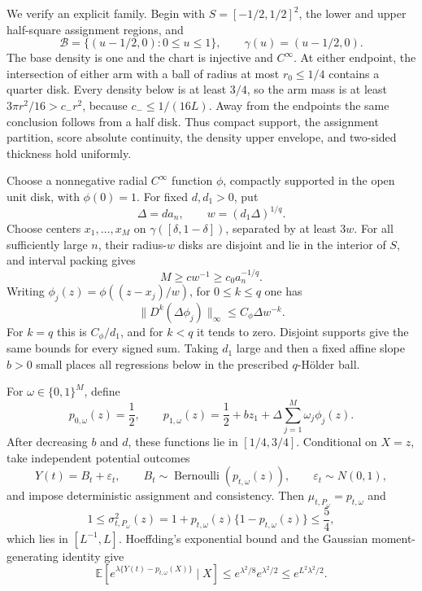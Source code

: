 We verify an explicit family.  Begin with \(S=[-1/2,1/2]^2\), the lower and upper half-square assignment regions, and
\[
 \mathcal B=\{(u-1/2,0):0\leq u\leq1\},
 \qquad \gamma(u)=(u-1/2,0).
\]
The base density is one and the chart is injective and \(C^\infty\).  At either endpoint, the intersection of either arm with a ball of radius at most \(r_0\leq1/4\) contains a quarter disk.  Every density below is at least \(3/4\), so the arm mass is at least \(3\pi r^2/16>c_-r^2\), because \(c_-\leq1/(16L)\).  Away from the endpoints the same conclusion follows from a half disk.  Thus compact support, the assignment partition, score absolute continuity, the density upper envelope, and two-sided thickness hold uniformly.

Choose a nonnegative radial \(C^\infty\) function \(\phi\), compactly supported in the open unit disk, with \(\phi(0)=1\).  For fixed \(d,d_1>0\), put
\[
 \Delta=d a_n,
 \qquad w=(d_1\Delta)^{1/q}.
\]
Choose centers \(x_1,\ldots,x_M\) on \(\gamma([\delta,1-\delta])\), separated by at least \(3w\).  For all sufficiently large \(n\), their radius-\(w\) disks are disjoint and lie in the interior of \(S\), and interval packing gives
\[
 M\geq c w^{-1}\geq c_0a_n^{-1/q}.
\]
Writing \(\phi_j(z)=\phi((z-x_j)/w)\), for \(0\leq k\leq q\) one has
\[
 \lVert D^k(\Delta\phi_j)\rVert_\infty
 \leq C_\phi\Delta w^{-k}.
\]
For \(k=q\) this is \(C_\phi/d_1\), and for \(k<q\) it tends to zero.  Disjoint supports give the same bounds for every signed sum.  Taking \(d_1\) large and then a fixed affine slope \(b>0\) small places all regressions below in the prescribed \(q\)-H\"older ball.

For \(\omega\in\{0,1\}^M\), define
\[
 p_{0,\omega}(z)=\frac12,
 \qquad
 p_{1,\omega}(z)=\frac12+bz_1+\Delta\sum_{j=1}^M\omega_j\phi_j(z).
\]
After decreasing \(b\) and \(d\), these functions lie in \([1/4,3/4]\).  Conditional on \(X=z\), take independent potential outcomes
\[
 Y(t)=B_t+\varepsilon_t,
 \qquad B_t\sim\operatorname{Bernoulli}(p_{t,\omega}(z)),
 \qquad \varepsilon_t\sim N(0,1),
\]
and impose deterministic assignment and consistency.  Then \(\mu_{t,P_\omega}=p_{t,\omega}\) and
\[
 1\leq\sigma^2_{t,P_\omega}(z)
 =1+p_{t,\omega}(z)\{1-p_{t,\omega}(z)\}
 \leq\frac54,
\]
which lies in \([L^{-1},L]\).  Hoeffding's exponential bound and the Gaussian moment-generating identity give
\[
 \mathbb E\!\left[e^{\lambda\{Y(t)-p_{t,\omega}(X)\}}\mid X\right]
 \leq e^{\lambda^2/8}e^{\lambda^2/2}
 \leq e^{L^2\lambda^2/2}.
\]

